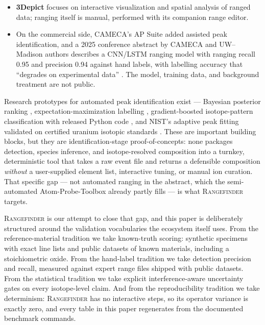\documentclass[11pt]{article}
\newcommand{\rf}{\textsc{Rangefinder}}
\begin{document}
\begin{itemize}
result that directly motivates our interference-aware uncertainty gates.
But the user begins by adding ion stems for the expected species, so it
quantifies and bounds a user-supplied hypothesis rather than discovering
the element vocabulary; it is likewise MATLAB-based.
\item \textbf{3Depict} focuses on interactive visualization and spatial
analysis of ranged data; ranging itself is manual, performed with its
companion range editor.
\item On the commercial side, CAMECA's AP Suite added assisted peak
identification, and a 2025 conference abstract by CAMECA and UW--Madison
authors describes a CNN/LSTM ranging model with ranging recall 0.95 and
precision 0.94 against hand labels, with labelling accuracy that
``degrades on experimental data'' \citep{wei2025automated}. The model,
training data, and background treatment are not public.
\end{itemize}

Research prototypes for automated peak identification exist ---
Bayesian posterior ranking \citep{mikhalychev2020}, expectation-maximization
labelling \citep{em2019}, gradient-boosted isotope-pattern classification
with released Python code \citep{wei2021patterns}, and NIST's adaptive peak
fitting validated on certified uranium isotopic standards
\citep{meisenkothen2021}. These are important building blocks, but they are
identification-stage proof-of-concepts: none packages detection, species
inference, and isotope-resolved composition into a turnkey, deterministic
tool that takes a raw event file and returns a defensible composition
\emph{without} a user-supplied element list, interactive tuning, or manual
ion curation. That specific gap --- not automated ranging in the abstract,
which the semi-automated Atom-Probe-Toolbox already partly fills --- is what
\rf{} targets.

\rf{} is our attempt to close that gap, and this paper is deliberately
structured around the validation vocabularies the ecosystem itself uses.
From the reference-material tradition \citep{meisenkothen2021} we take
known-truth scoring: synthetic specimens with exact line lists and public
datasets of known materials, including a stoichiometric oxide. From the
hand-label tradition \citep{wei2025automated} we take detection precision
and recall, measured against expert range files shipped with public
datasets. From the statistical tradition \citep{london2019} we take
explicit interference-aware uncertainty gates on every isotope-level
claim. And from the reproducibility tradition
\citep{kuhbach2021,heller2024matlab,monajem2025pyccapt} we take
determinism: \rf{} has no interactive steps, so its operator variance is
exactly zero, and every table in this paper regenerates from the documented
benchmark commands.
\end{document}
